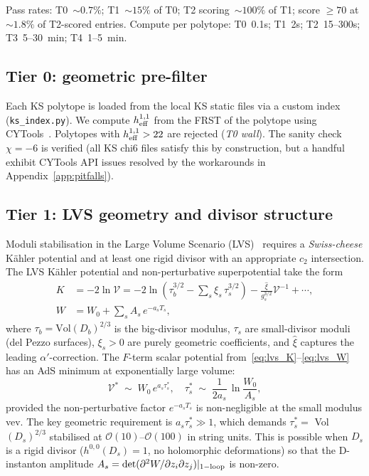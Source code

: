 \documentclass[11pt,a4paper]{article}
\newcommand{\hone}{h^{1,1}}
\newcommand{\cO}{\mathcal{O}}
\begin{document}
Pass rates: T0~$\sim 0.7\%$; T1~$\sim 15\%$ of T0;
T2 scoring~$\sim 100\%$ of T1; score $\geq 70$ at
$\sim 1.8\%$ of T2-scored entries.
Compute per polytope: T0~0.1s; T1~2s; T2~15--300s;
T3~5--30~min; T4~1--5~min.

\subsection{Tier 0: geometric pre-filter}

Each KS polytope is loaded from the local KS static files
via a custom index (\texttt{ks\_index.py}).
We compute $\hone_{\rm eff}$ from the FRST of the polytope
using CYTools~\cite{CYTools2022}.
Polytopes with $\hone_{\rm eff} > 22$ are rejected (\emph{T0 wall}).
The sanity check $\chi = -6$ is verified (all KS chi6 files
satisfy this by construction, but a handful exhibit CYTools
API issues resolved by the workarounds in Appendix~\ref{app:pitfalls}).

\subsection{Tier 1: LVS geometry and divisor structure}

Moduli stabilisation in the Large Volume Scenario
(LVS)~\cite{Balasubramanian2005} requires a 
\emph{Swiss-cheese} Kähler potential and at least one rigid
divisor with an appropriate $c_2$ intersection.
The LVS Kähler potential and non-perturbative superpotential take
the form
\begin{align}
  K &= -2\ln\mathcal{V}
    = -2\ln\!\left(\tau_b^{3/2}
        - \sum_s \xi_s\,\tau_s^{3/2}\right)
    - \frac{\hat\xi}{g_s^{3/2}} \mathcal{V}^{-1} + \cdots,
  \label{eq:lvs_K} \\
  W &= W_0 + \sum_s A_s\, e^{-a_s T_s},
  \label{eq:lvs_W}
\end{align}
where $\tau_{b} = \text{Vol}(D_b)^{2/3}$ is the big-divisor
modulus, $\tau_s$ are small-divisor moduli (del Pezzo surfaces),
$\xi_s > 0$ are purely geometric coefficients, and $\hat\xi$
captures the leading $\alpha'$-correction.
The $F$-term scalar potential from~\eqref{eq:lvs_K}--\eqref{eq:lvs_W}
has an AdS minimum at exponentially large volume:
\begin{equation}
  \mathcal{V}^* \;\sim\; W_0\,e^{a_s\tau_s^*},
  \quad \tau_s^* \;\sim\;
  \frac{1}{2a_s}\,\ln\frac{W_0}{A_s},
  \label{eq:lvs_min}
\end{equation}
provided the non-perturbative factor $e^{-a_s T_s}$ is
non-negligible at the small modulus vev.
The key geometric requirement is $a_s\tau_s^* \gg 1$,
which demands $\tau_s^* = $ Vol$(D_s)^{2/3}$ stabilised at
$\cO(10)$--$\cO(100)$ in string units.  This is possible when
$D_s$ is a rigid divisor ($h^{0,0}(D_s)=1$, no holomorphic
deformations) so that the D-instanton amplitude
$A_s = \det(\partial^2 W/\partial z_i \partial z_j)|_{\rm 1-loop}$
is non-zero.
\end{document}
